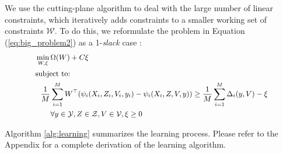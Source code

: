 We use the cutting-plane algorithm \cite{Joachims2009} to deal with the large number of linear
constraints, which iteratively adds constraints to a smaller working set of constraints $\mathcal{W}$. To do this, we reformulate the problem in Equation (\ref{eq:big_problem2}) as a 
1-\emph{slack} case \cite{Joachims2009}:
%
\begin{align}
\label{eq:big_problem2_1_slack}
\small
\begin{split}
& \min_{W, \xi}
      \Omega(W)
 + C\xi \\
& \text{subject to:} \\
& ~~ \frac{1}{M}\sum_{i=1}^M W^\top(\psi_i(X_i, Z_i, V_i, y_i) - \psi_i(X_i, Z, V, y))
      \geq  \frac{1}{M}\sum_{i=1}^M\Delta_i( y, V) - \xi \\
  &\quad \quad \forall y \in \mathcal{Y}, Z \in \mathcal{Z},
      V \in \mathcal{V}, \xi \ge 0
\end{split}
\normalsize
\end{align}

Algorithm \ref{alg:learning} summarizes the learning process. Please refer to the Appendix for a 
complete derivation of the learning algorithm.

